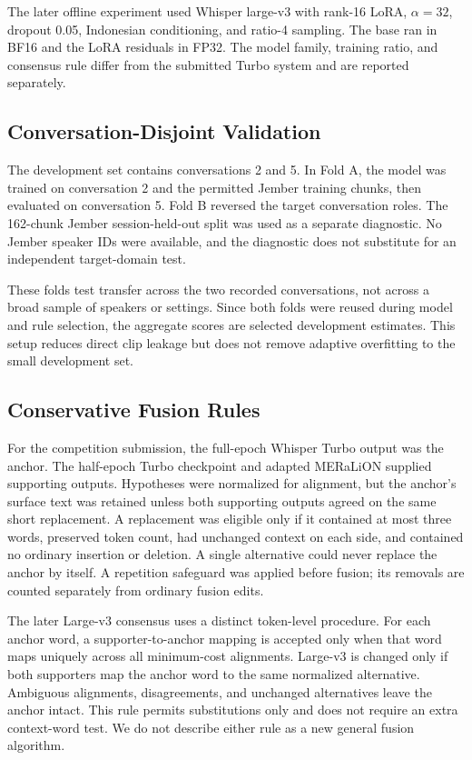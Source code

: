 \documentclass[journal]{IEEEtran}
\begin{document}
The later offline experiment used Whisper large-v3 with rank-16 LoRA, \(\alpha=32\), dropout 0.05, Indonesian conditioning, and ratio-4 sampling. The base ran in BF16 and the LoRA residuals in FP32. The model family, training ratio, and consensus rule differ from the submitted Turbo system and are reported separately.

\subsection{Conversation-Disjoint Validation}
The development set contains conversations 2 and 5. In Fold A, the model was trained on conversation 2 and the permitted Jember training chunks, then evaluated on conversation 5. Fold B reversed the target conversation roles. The 162-chunk Jember session-held-out split was used as a separate diagnostic. No Jember speaker IDs were available, and the diagnostic does not substitute for an independent target-domain test.

These folds test transfer across the two recorded conversations, not across a broad sample of speakers or settings. Since both folds were reused during model and rule selection, the aggregate scores are selected development estimates. This setup reduces direct clip leakage but does not remove adaptive overfitting to the small development set.

\subsection{Conservative Fusion Rules}
For the competition submission, the full-epoch Whisper Turbo output was the anchor. The half-epoch Turbo checkpoint and adapted MERaLiON supplied supporting outputs. Hypotheses were normalized for alignment, but the anchor's surface text was retained unless both supporting outputs agreed on the same short replacement. A replacement was eligible only if it contained at most three words, preserved token count, had unchanged context on each side, and contained no ordinary insertion or deletion. A single alternative could never replace the anchor by itself. A repetition safeguard was applied before fusion; its removals are counted separately from ordinary fusion edits.

The later Large-v3 consensus uses a distinct token-level procedure. For each anchor word, a supporter-to-anchor mapping is accepted only when that word maps uniquely across all minimum-cost alignments. Large-v3 is changed only if both supporters map the anchor word to the same normalized alternative. Ambiguous alignments, disagreements, and unchanged alternatives leave the anchor intact. This rule permits substitutions only and does not require an extra context-word test. We do not describe either rule as a new general fusion algorithm.
\end{document}

